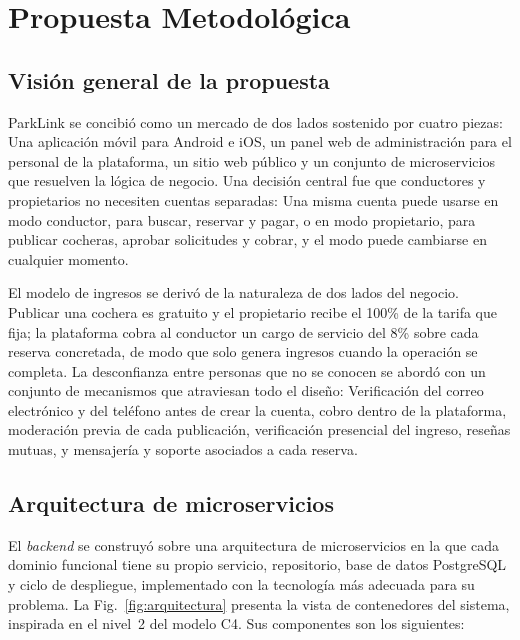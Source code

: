 \documentclass[conference,a4paper]{IEEEtran}
\begin{document}
\section{Propuesta Metodológica}\label{sec:propuesta}

\subsection{Visión general de la propuesta}

ParkLink se concibió como un mercado de dos lados sostenido por cuatro piezas: Una aplicación móvil para Android e iOS, un panel web de administración para el personal de la plataforma, un sitio web público y un conjunto de microservicios que resuelven la lógica de negocio. Una decisión central fue que conductores y propietarios no necesiten cuentas separadas: Una misma cuenta puede usarse en modo conductor, para buscar, reservar y pagar, o en modo propietario, para publicar cocheras, aprobar solicitudes y cobrar, y el modo puede cambiarse en cualquier momento.

El modelo de ingresos se derivó de la naturaleza de dos lados del negocio. Publicar una cochera es gratuito y el propietario recibe el 100\% de la tarifa que fija; la plataforma cobra al conductor un cargo de servicio del 8\% sobre cada reserva concretada, de modo que solo genera ingresos cuando la operación se completa. La desconfianza entre personas que no se conocen se abordó con un conjunto de mecanismos que atraviesan todo el diseño: Verificación del correo electrónico y del teléfono antes de crear la cuenta, cobro dentro de la plataforma, moderación previa de cada publicación, verificación presencial del ingreso, reseñas mutuas, y mensajería y soporte asociados a cada reserva.

\subsection{Arquitectura de microservicios}

El \textit{backend} se construyó sobre una arquitectura de microservicios en la que cada dominio funcional tiene su propio servicio, repositorio, base de datos PostgreSQL y ciclo de despliegue, implementado con la tecnología más adecuada para su problema. La Fig.~\ref{fig:arquitectura} presenta la vista de contenedores del sistema, inspirada en el nivel~2 del modelo C4. Sus componentes son los siguientes:
\end{document}
